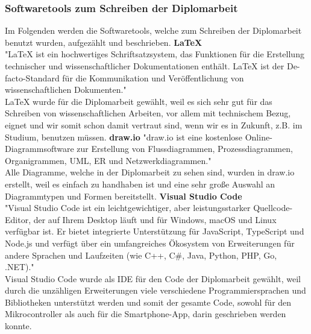 \documentclass[11pt, twoside]{article}
\begin{document}
\subsubsection{Softwaretools zum Schreiben der Diplomarbeit}
Im Folgenden werden die Softwaretools, welche zum Schreiben der Diplomarbeit benutzt wurden, aufgezählt und beschrieben.
\vspace{4mm}\newline
\textbf{LaTeX} \\
"LaTeX ist ein hochwertiges Schriftsatzsystem, das Funktionen für die Erstellung technischer und wissenschaftlicher Dokumentationen enthält. LaTeX ist der De-facto-Standard für die Kommunikation und Veröffentlichung von wissenschaftlichen Dokumenten." \parencite{noauthor_urlpi29_nodate} \\
LaTeX wurde für die Diplomarbeit gewählt, weil es sich sehr gut für das Schreiben von wissenschaftlichen Arbeiten, vor allem mit technischem Bezug, eignet und wir somit schon damit vertraut sind, wenn wir es in Zukunft, z.B. im Studium, benutzen müssen.
\vspace{4mm}\newline
\textbf{draw.io}
"draw.io ist eine kostenlose Online-Diagrammsoftware zur Erstellung von Flussdiagrammen, Prozessdiagrammen, Organigrammen, UML, ER und Netzwerkdiagrammen." \parencite{noauthor_urlpi30_nodate} \\
Alle Diagramme, welche in der Diplomarbeit zu sehen sind, wurden in draw.io erstellt, weil es einfach zu handhaben ist und eine sehr große Auswahl an Diagrammtypen und Formen bereitstellt.
\vspace{4mm}\newline
\textbf{Visual Studio Code} \\
"Visual Studio Code ist ein leichtgewichtiger, aber leistungsstarker Quellcode-Editor, der auf Ihrem Desktop läuft und für Windows, macOS und Linux verfügbar ist. Er bietet integrierte Unterstützung für JavaScript, TypeScript und Node.js und verfügt über ein umfangreiches Ökosystem von Erweiterungen für andere Sprachen und Laufzeiten (wie C++, C\#, Java, Python, PHP, Go, .NET)." \parencite{noauthor_urlpi31_nodate} \\
Visual Studio Code wurde als IDE für den Code der Diplomarbeit gewählt, weil durch die unzähligen Erweiterungen viele verschiedene Programmiersprachen und Bibliotheken unterstützt werden und somit der gesamte Code, sowohl für den Mikrocontroller als auch für die Smartphone-App, darin geschrieben werden konnte.
\vspace{4mm}\newline
\end{document}
